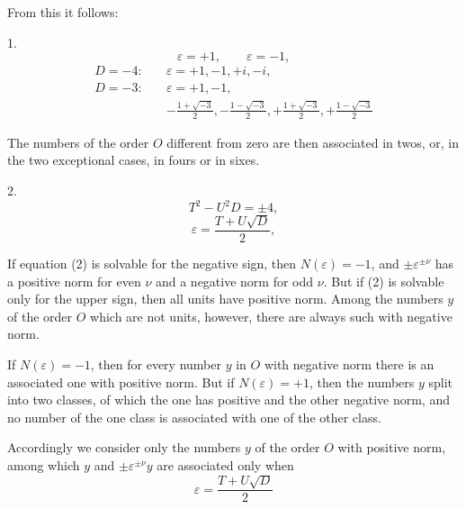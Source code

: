 From this it follows:

1. 
\[ \varepsilon = +1, \qquad \varepsilon = -1, \]
\[
\begin{aligned}
D=-4\colon\quad &\varepsilon=+1,-1,+i,-i,\\
D=-3\colon\quad &\varepsilon=+1,-1,\\
&-\frac{1+\sqrt{-3}}{2},-\frac{1-\sqrt{-3}}{2},+\frac{1+\sqrt{-3}}{2},+\frac{1-\sqrt{-3}}{2}
\end{aligned}
\]

The numbers of the order $O$ different from zero are then associated in twos, or, in the two exceptional cases, in fours or in sixes.

2. 
\[ T^2 - U^2 D = \pm 4, \]
\[ \varepsilon = \frac{T + U\sqrt{D}}{2}, \]

If equation (2) is solvable for the negative sign, then $N(\varepsilon) = -1$, and $\pm \varepsilon^{\pm\nu}$ has a positive norm for even $\nu$ and a negative norm for odd $\nu$. But if (2) is solvable only for the upper sign, then all units have positive norm. Among the numbers $y$ of the order $O$ which are not units, however, there are always such with negative norm.

If $N(\varepsilon) = -1$, then for every number $y$ in $O$ with negative norm there is an associated one with positive norm. But if $N(\varepsilon) = +1$, then the numbers $y$ split into two classes, of which the one has positive and the other negative norm, and no number of the one class is associated with one of the other class.

Accordingly we consider only the numbers $y$ of the order $O$ with positive norm, among which $y$ and $\pm \varepsilon^{\pm\nu} y$ are associated only when
\[ \varepsilon = \frac{T + U\sqrt{D}}{2} \]

